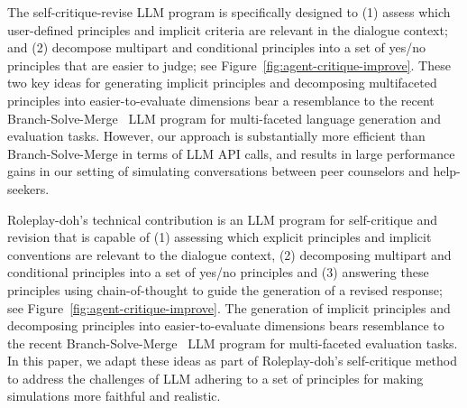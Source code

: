 The self-critique-revise LLM program is specifically designed to (1) assess which user-defined principles and implicit criteria are relevant in the dialogue context; and (2) decompose multipart and conditional principles into a set of yes/no principles that are easier to judge; see Figure~\ref{fig:agent-critique-improve}. These two key ideas for generating implicit principles and decomposing multifaceted principles into easier-to-evaluate dimensions bear a resemblance to the recent Branch-Solve-Merge~\cite{saha2023branchsolvemerge} LLM program for multi-faceted language generation and evaluation tasks. However, our approach is substantially more efficient than Branch-Solve-Merge in terms of LLM API calls, and results in large performance gains in our setting of simulating conversations between peer counselors and help-seekers.


Roleplay-doh's technical contribution is an LLM program for self-critique and revision that is capable of (1) assessing which explicit principles and implicit conventions are relevant to the dialogue context, (2) decomposing multipart and conditional principles into a set of yes/no principles and (3) answering these principles using chain-of-thought to guide the generation of a revised response; see Figure~\ref{fig:agent-critique-improve}. The generation of implicit principles and decomposing principles into easier-to-evaluate dimensions bears resemblance to the recent Branch-Solve-Merge~\cite{saha2023branchsolvemerge} LLM program for multi-faceted evaluation tasks. In this paper, we adapt these ideas as part of Roleplay-doh's self-critique method to address the challenges of LLM adhering to a set of principles for making simulations more faithful and realistic. 
\fi 


